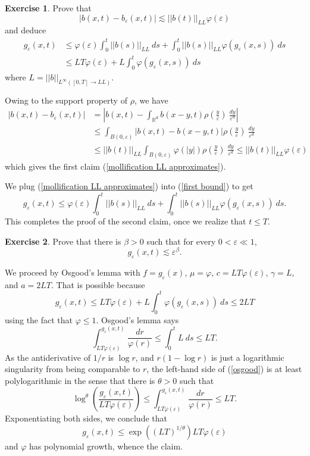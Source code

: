 \documentclass[10pt]{article}
\newcommand{\RR}{\mathbb{R}}
\renewcommand{\epsilon}{\varepsilon}
\theoremstyle{definition}
\newtheorem{exer}{Exercise}
\begin{document}
\begin{exer}
Prove that
\begin{equation}
\label{mollification LL approximates}
|b(x, t) - b_\varepsilon(x, t)| \lesssim ||b(t)||_{LL} \varphi(\varepsilon)
\end{equation}
and deduce
\begin{align*}
g_\varepsilon(x, t) &\leq \varphi(\epsilon) \int_0^t ||b(s)||_{LL} ~ds + \int_0^t ||b(s)||_{LL} \varphi(g_\epsilon(x, s)) ~ds\\
&\leq LT\varphi(\epsilon) + L\int_0^t \varphi(g_\epsilon(x, s)) ~ds
\end{align*}
where $L = ||b||_{L^\infty([0, T] \to LL)}$.
\end{exer}

Owing to the support property of $\rho$, we have
\begin{align*}
|b(x, t) - b_\epsilon(x, t)| &= \left|b(x, t) - \int_{\RR^d} b(x - y, t) \rho\left(\frac{y}{\epsilon}\right)~\frac{dy}{\epsilon^d}\right|\\
&\leq \int_{B(0,\epsilon)} |b(x, t) - b(x - y, t)| \rho\left(\frac{y}{\epsilon}\right)~\frac{dy}{\epsilon^d}\\
&\leq ||b(t)||_{LL} \int_{B(0,\epsilon)} \varphi(|y|) \rho\left(\frac{y}{\epsilon}\right)~\frac{dy}{\epsilon^d} \leq ||b(t)||_{LL} \varphi(\epsilon)
\end{align*}
which gives the first claim (\ref{mollification LL approximates}).

We plug (\ref{mollification LL approximates}) into (\ref{first bound}) to get
$$g_\epsilon(x, t) \leq \varphi(\epsilon) \int_0^t ||b(s)||_{LL} ~ds + \int_0^t ||b(s)||_{LL} \varphi(g_\epsilon(x, s)) ~ds.$$
This completes the proof of the second claim, once we realize that $t \leq T$.

\begin{exer}
Prove that there is $\beta > 0$ such that for every $0 < \epsilon \ll 1$,
$$g_\epsilon(x, t) \lesssim \epsilon^\beta.$$
\end{exer}

We proceed by Osgood's lemma with $f = g_\epsilon(x)$, $\mu = \varphi$, $c = LT\varphi(\epsilon)$, $\gamma = L$, and $a = 2LT$. That is possible because
$$g_\epsilon(x, t) \leq LT\varphi(\epsilon) + L\int_0^t \varphi(g_\epsilon(x, s)) ~ds \leq 2LT$$
using the fact that $\varphi \leq 1$.
Osgood's lemma says
\begin{equation}
\label{osgood}
\int_{LT\varphi(\epsilon)}^{g_\epsilon(x, t)} \frac{dr}{\varphi(r)} \leq \int_0^t L~ds \leq LT.
\end{equation}
As the antiderivative of $1/r$ is $\log r$, and $r(1 - \log r)$ is just a logarithmic singularity from being comparable to $r$, the left-hand side of (\ref{osgood}) is at least polylogarithmic in the sense that there is $\theta > 0$ such that
$$\log^\theta\left(\frac{g_\epsilon(x, t)}{LT\varphi(\epsilon)}\right) \leq \int_{LT\varphi(\epsilon)}^{g_\epsilon(x, t)} \frac{dr}{\varphi(r)} \leq LT.$$
Exponentiating both sides, we conclude that
$$g_\epsilon(x, t) \leq \exp\left((LT)^{1/\theta}\right) LT\varphi(\epsilon)$$
and $\varphi$ has polynomial growth, whence the claim.
\end{document}
